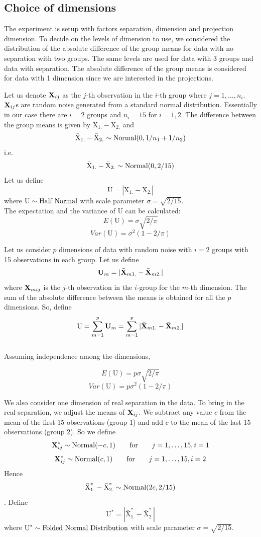 \subsection{Choice of dimensions} \label{sec:theory}

The experiment is setup with factors separation, dimension and projection dimension. To decide on the levels of dimension to use, we considered the distribution of the absolute difference of the group means for data with no separation with two groups. The same levels are used for data with 3 groups and data with separation. The absolute difference of the group means is considered for data with 1 dimension since we are interested in the projections.

Let us denote ${\bf{X}}_{ij}$ as the $j$-th observation in the $i$-th group where $j = 1, \dots, n_i$. ${\bf{X}}_{ij}$s are random noise generated from a standard normal distribution. Essentially in our case there are $i = 2$ groups and $n_i = 15$ for $i = 1, 2$. The difference between the group means is given by $\bar{\mbox{X}}_{1.} - \bar{\mbox{X}}_{2.}$ and $$\bar{\mbox{X}}_{1.} - \bar{\mbox{X}}_{2.} \sim \hbox{Normal}(0, 1/n_1 + 1/n_2)$$ i.e. $$\bar{\mbox{X}}_{1.} - \bar{\mbox{X}}_{2.} \sim \hbox{Normal}(0, 2/15)$$ Let us define 
$$\mbox{U} = |\bar{\mbox{X}} _{1.} - \bar{\mbox{X}}_{2.}|$$ 
where $\mbox{U} \sim \hbox{Half Normal}$ with scale parameter $ \sigma = \sqrt{2/15}$. \\

The expectation and the variance of $\mbox{U}$ can be calculated: 
$$E(\mbox{U} ) = \sigma \sqrt{2/\pi}$$
$$Var(\mbox{U}) = \sigma^2 (1 - 2/\pi)$$

Let us consider $p$ dimensions of data with random noise with $i = 2$ groups with 15 observations in each group. Let us define $${\bf{U}}_m = |\bar{{\bf{X}}}_{m1.} - \bar{{\bf{X}}}_{m2.}|$$ where ${\bf{X}} _{mij}$ is the $j$-th observation in the $i$-group for the $m$-th dimension. The sum of the absolute difference between the means is obtained for all the $p$ dimensions. So, define $$\mbox{U}  = \sum_{m=1}^p {\bf{U}} _m = \sum_{m=1}^p |\bar{{\bf{X}}}_{m1.} - \bar{{\bf{X}}}_{m2.}| $$ \\

Assuming independence among the dimensions,

$$E(\mbox{U}) = p \sigma \sqrt{2/\pi}$$
$$Var(\mbox{U}) = p \sigma^2 (1 - 2/\pi)$$

We also consider one dimension of real separation in the data. To bring in the real separation, we adjust the means of ${\bf{X}}_{ij}$. We subtract any value $c$ from the mean of the first 15 observations (group 1) and add $c$ to the mean of the last 15 observations (group 2). So we define
$${\bf{X}}_{ij}^* \sim \hbox{Normal}(- c, 1) \qquad \hbox{for} \qquad j = 1, \dots, 15, i = 1$$
$${\bf{X}}_{ij}^* \sim \hbox{Normal}(c, 1) \qquad \hbox{for} \qquad j = 1, \dots, 15, i = 2$$ 
Hence $$\bar{\mbox{X}}_{1.}^* - \bar{\mbox{X}}_{2.}^* \sim \hbox{Normal}(2c, 2/15)$$. Define $$\mbox{U}^*  = |\bar{\mbox{X}}_{1.}^* - \bar{\mbox{X}}_{2.}^*|$$ where ${\mbox{U}}^* \sim \hbox{Folded Normal Distribution}$ with scale parameter $ \sigma = \sqrt{2/15}$.  \\

